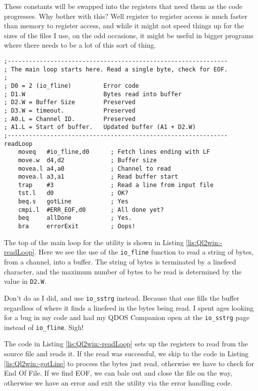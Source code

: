 These constants will be swapped into the registers that need them
as the code progresses. Why bother with this? Well register to register
access is much faster than memory to register access, and while it
might not speed things up for the sizes of the files I use, on the
odd occasions, it might be useful in bigger programs where there needs
to be a lot of this sort of thing.

\begin{lstlisting}[caption={Ql2win: readLoop},label={lis:Ql2win:-readLoop},firstnumber=85]
;--------------------------------------------------------------
; The main loop starts here. Read a single byte, check for EOF.
;
; D0 = 2 (io_fline)         Error code
; D1.W                      Bytes read into buffer
; D2.W = Buffer Size        Preserved
; D3.W = timeout.           Preserved
; A0.L = Channel ID.        Preserved
; A1.L = Start of buffer.   Updated buffer (A1 + D2.W)
;--------------------------------------------------------------
readLoop
    moveq   #io_fline,d0      ; Fetch lines ending with LF
    move.w  d4,d2             ; Buffer size
    movea.l a4,a0             ; Channel to read
    movea.l a3,a1             ; Read buffer start
    trap    #3                ; Read a line from input file
    tst.l   d0                ; OK?
    beq.s   gotLine           ; Yes
    cmpi.l  #ERR_EOF,d0       ; All done yet?
    beq     allDone           ; Yes.
    bra     errorExit         ; Oops!
\end{lstlisting}

The top of the main loop for the utility is shown in Listing \ref{lis:Ql2win:-readLoop}.
Here we see the use of the \lstinline[basicstyle={\ttfamily},showstringspaces=false]!io_fline!
function to read a string of bytes, from a channel, into a buffer.
The string of bytes is terminated by a linefeed character, and the
maximum number of bytes to be read is determined by the value in \lstinline[basicstyle={\ttfamily},showstringspaces=false]!D2.W!.

Don't do as I did, and use \lstinline[basicstyle={\ttfamily},showstringspaces=false]!io_sstrg!
instead. Because that one fills the buffer regardless of where it
finds a linefeed in the bytes being read. I spent ages looking for
a bug in my code and had my QDOS Companion open at the \lstinline[basicstyle={\ttfamily},showstringspaces=false]!io_sstrg!
page instead of \lstinline[basicstyle={\ttfamily},showstringspaces=false]!io_fline!.
Sigh!

The code in Listing \ref{lis:Ql2win:-readLoop} sets up the registers
to read from the source file and reads it. If the read was successful,
we skip to the code in Listing \ref{lis:Ql2win:-gotLine} to process
the bytes just read, otherwise we have to check for End Of File. If
we find EOF, we can bale out and close the file on the way, otherwise
we have an error and exit the utility via the error handling code.

